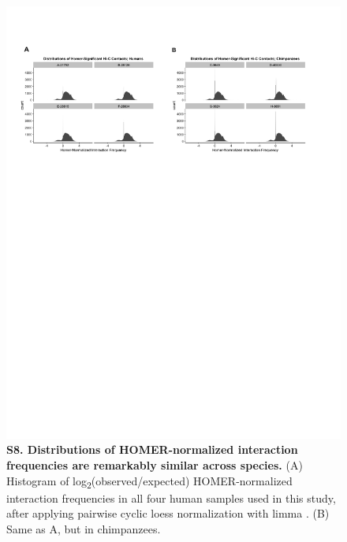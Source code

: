 \begin{figure}[!htb]
\centering
\includegraphics[width=6in]{img/figS8.pdf}
\caption[Distributions of HOMER-normalized interaction frequencies are remarkably similar across species.]{\textbf{S8. Distributions of HOMER-normalized interaction frequencies are remarkably similar across species.} (A) Histogram of log\textsubscript{2}(observed/expected) HOMER-normalized interaction frequencies in all four human samples used in this study, after applying pairwise cyclic loess normalization with limma \cite{Smyth.2004}. (B) Same as A, but in chimpanzees.}
\label{fig:figS8}
\end{figure}

